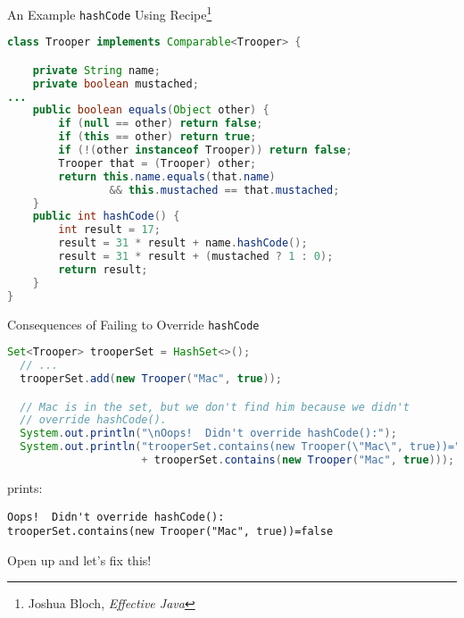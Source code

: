 \documentclass{beamer}
\begin{document}
\begin{frame}[fragile]{An Example {\tt hashCode} Using Recipe\footnote{Joshua Bloch, {\it Effective Java}}}

\begin{lstlisting}[language=Java]
class Trooper implements Comparable<Trooper> {

    private String name;
    private boolean mustached;
...
    public boolean equals(Object other) {
        if (null == other) return false;
        if (this == other) return true;
        if (!(other instanceof Trooper)) return false;
        Trooper that = (Trooper) other;
        return this.name.equals(that.name)
                && this.mustached == that.mustached;
    }
    public int hashCode() {
        int result = 17;
        result = 31 * result + name.hashCode();
        result = 31 * result + (mustached ? 1 : 0);
        return result;
    }
}
\end{lstlisting}

\end{frame}

\begin{frame}[fragile]{Consequences of Failing to Override {\tt hashCode}}

\begin{lstlisting}[language=Java]
  Set<Trooper> trooperSet = HashSet<>();
  // ...
  trooperSet.add(new Trooper("Mac", true));

  // Mac is in the set, but we don't find him because we didn't
  // override hashCode().
  System.out.println("\nOops!  Didn't override hashCode():");
  System.out.println("trooperSet.contains(new Trooper(\"Mac\", true))="
                     + trooperSet.contains(new Trooper("Mac", true)));

\end{lstlisting}
prints:
\begin{verbatim}
Oops!  Didn't override hashCode():
trooperSet.contains(new Trooper("Mac", true))=false
\end{verbatim}

Open up  and let's fix this!

\end{frame}
\end{document}
